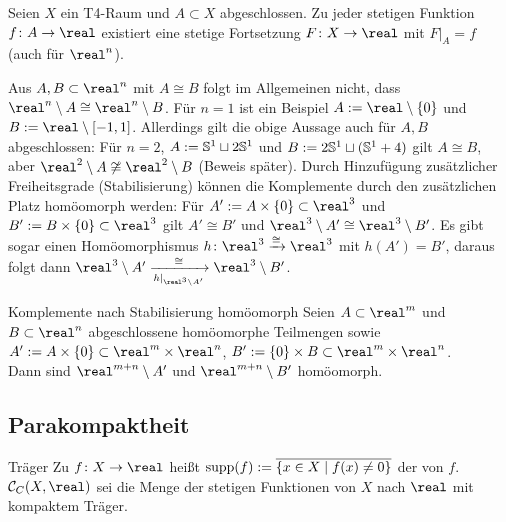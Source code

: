 \begin{Kor}
    Seien $X$ ein T4-Raum und $A \subset X$ abgeschlossen.
    Zu jeder stetigen Funktion $f\colon A \rightarrow \real$ existiert
    eine stetige Fortsetzung $F\colon X \rightarrow \real$ mit $F|_A = f$
    (auch für $\real^n$).
\end{Kor}

\linie

\begin{Bem}
    Aus $A, B \subset \real^n$ mit $A \cong B$ folgt im Allgemeinen nicht,
    dass $\real^n \setminus A \cong \real^n \setminus B$.
    Für $n = 1$ ist ein Beispiel $A := \real \setminus \{0\}$ und
    $B := \real \setminus [-1, 1]$.
    Allerdings gilt die obige Aussage auch für $A, B$ abgeschlossen:
    Für $n = 2$, $A := \mathbb{S}^1 \sqcup 2\mathbb{S}^1$ und
    $B := 2\mathbb{S}^1 \sqcup (\mathbb{S}^1 + 4)$ gilt
    $A \cong B$, aber $\real^2 \setminus A \not\cong \real^2 \setminus B$
    (Beweis später).
    Durch Hinzufügung zusätzlicher Freiheitsgrade (Stabilisierung)
    können die Komplemente durch den zusätzlichen Platz homöomorph werden:
    Für $A' := A \times \{0\} \subset \real^3$ und
    $B' := B \times \{0\} \subset \real^3$ gilt $A' \cong B'$ und
    $\real^3 \setminus A' \cong \real^3 \setminus B'$.
    Es gibt sogar einen Homöomorphismus $h\colon \real^3 \homoe \real^3$
    mit $h(A') = B'$, daraus folgt dann
    $\real^3 \setminus A' \xrightarrow[h|_{\real^3 \setminus A'}]{\cong}
    \real^3 \setminus B'$.
\end{Bem}

\begin{Satz}{Komplemente nach Stabilisierung homöomorph}
    Seien $A \subset \real^m$ und $B \subset \real^n$ abgeschlossene
    homöomorphe Teilmengen sowie
    $A' := A \times \{0\} \subset \real^m \times \real^n$,
    $B' := \{0\} \times B \subset \real^m \times \real^n$. \\
    Dann sind $\real^{m+n} \setminus A'$ und $\real^{m+n} \setminus B'$
    homöomorph.
\end{Satz}

\subsection{%
    Parakompaktheit%
}

\begin{Def}{Träger}
    Zu $f\colon X \rightarrow \real$ heißt
    $\operatorname{supp}(f) := \overline{\{x \in X \;|\; f(x) \not= 0\}}$ der
     von $f$. \\
    $\C_C(X, \real)$ sei die Menge der stetigen Funktionen von $X$ nach $\real$
    mit kompaktem Träger.
\end{Def}

